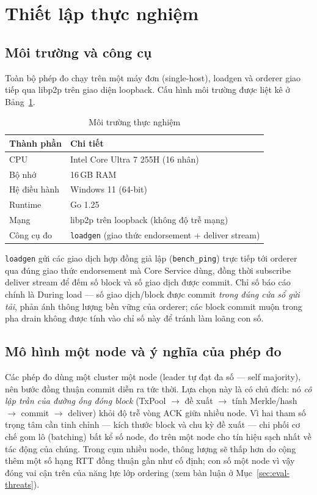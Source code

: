 \section{Thiết lập thực nghiệm}
\label{sec:eval-setup}

\subsection{Môi trường và công cụ}
\label{sec:eval-env}

Toàn bộ phép đo chạy trên một máy đơn (single-host), loadgen và orderer giao tiếp
qua libp2p trên giao diện loopback. Cấu hình môi trường được liệt kê ở
Bảng~\ref{tab:eval-env}.

\begin{table}[H]
\centering
\caption{Môi trường thực nghiệm}
\label{tab:eval-env}
\begin{tabular}{@{}p{4.5cm}p{8cm}@{}}
\toprule
\textbf{Thành phần} & \textbf{Chi tiết} \\
\midrule
CPU & Intel Core Ultra 7 255H (16 nhân) \\
Bộ nhớ & 16\,GB RAM \\
Hệ điều hành & Windows 11 (64-bit) \\
Runtime & Go 1.25 \\
Mạng & libp2p trên loopback (không độ trễ mạng) \\
Công cụ đo & \texttt{loadgen} (giao thức endorsement + deliver stream) \\
\bottomrule
\end{tabular}
\end{table}

\texttt{loadgen} gửi các giao dịch hợp đồng giả lập (\texttt{bench\_ping}) trực
tiếp tới orderer qua đúng giao thức endorsement mà Core Service dùng, đồng thời
subscribe deliver stream để đếm số block và số giao dịch được commit. Chỉ số báo
cáo chính là During load --- số giao dịch/block được commit \textit{trong
đúng cửa sổ gửi tải}, phản ánh thông lượng bền vững của orderer; các block commit
muộn trong pha drain không được tính vào chỉ số này để tránh làm loãng con số.

\subsection{Mô hình một node và ý nghĩa của phép đo}
\label{sec:eval-singlenode}

Các phép đo dùng một cluster một node (leader tự đạt đa số --- self
majority), nên bước đồng thuận commit diễn ra tức thời. Lựa chọn này là có chủ
đích: nó \textit{cô lập trần của đường ống đóng block} (TxPool $\rightarrow$ đề
xuất $\rightarrow$ tính Merkle/hash $\rightarrow$ commit $\rightarrow$ deliver)
khỏi độ trễ vòng ACK giữa nhiều node. Vì hai tham số trọng tâm cần tinh chỉnh ---
kích thước block và chu kỳ đề xuất --- chi phối cơ chế gom lô (batching) bất kể số
node, đo trên một node cho tín hiệu sạch nhất về tác động của chúng. Trong cụm
nhiều node, thông lượng sẽ thấp hơn do cộng thêm một số hạng RTT đồng thuận gần
như cố định; con số một node vì vậy đóng vai cận trên của năng lực lớp
ordering (xem bàn luận ở Mục~\ref{sec:eval-threats}).

